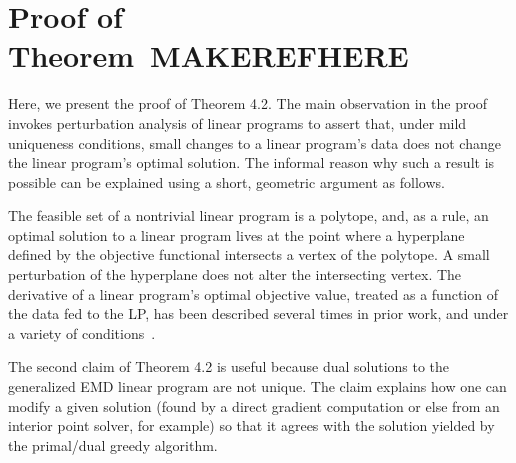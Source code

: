 \section{Proof of Theorem~MAKEREFHERE}\label{sec:app-proof}
\label{sec:proofthm}

Here, we present the proof of Theorem 4.2.  The main observation in the proof invokes perturbation analysis \cite{mangasarian1979nonlinear,ferris1991finite} of linear programs to assert that, under mild uniqueness conditions, small changes to a linear program's data does not change the linear program's optimal solution. The informal reason why such a result is possible can be explained using a  short,  geometric argument as follows. 

The feasible set of a nontrivial linear program is a polytope, and, as a rule, an optimal solution to a linear program lives at the point where a hyperplane defined by the objective functional intersects a vertex of the polytope. A small perturbation of the hyperplane does not alter the intersecting vertex. The derivative of a linear program's optimal objective value, treated as a function of the data fed to the LP, has been described several times in prior work, and under a variety of conditions~\cite{dewolf,freund1985postoptimal,agueh2011barycenters,Mills19578MV}.

The second claim of Theorem 4.2 is useful because dual solutions to the generalized EMD linear program are not unique.  The claim explains how one can modify a given solution (found by a direct gradient computation or else from an interior point solver, for example) so that it agrees with the solution yielded by the primal/dual greedy algorithm. 

